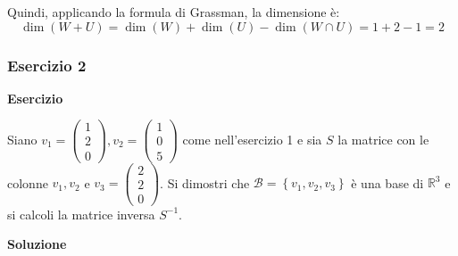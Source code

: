 \documentclass[a4paper]{article}
\begin{document}
	\noindent
	Quindi, applicando la formula di Grassman, la dimensione è:
	\begin{equation*}
		\dim\left(W+U\right) = \dim\left(W\right) + \dim\left(U\right) - \dim\left(W \cap U\right) = 1 + 2 - 1 = 2
	\end{equation*}\newpage

	\subsubsection{Esercizio 2}

	\textcolor{Red3}{\textbf{Esercizio}}\newline
	
	\noindent
	Siano $v_{1} = \begin{pmatrix}
		1 \\
		2 \\
		0
	\end{pmatrix}, v_{2} = \begin{pmatrix}
		1 \\
		0 \\
		5
	\end{pmatrix}$ come nell'esercizio 1 e sia $S$ la matrice con le colonne $v_{1}, v_{2}$ e $v_{3} = \begin{pmatrix}
		2 \\
		2 \\
		0
	\end{pmatrix}$. Si dimostri che $\mathcal{B} = \left\{v_{1}, v_{2}, v_{3}\right\}$ è una base di $\mathbb{R}^{3}$ e si calcoli la matrice inversa $S^{-1}$.\newline
	
	\noindent
	\textcolor{Green4}{\textbf{Soluzione}}\newline
	
\end{document}
